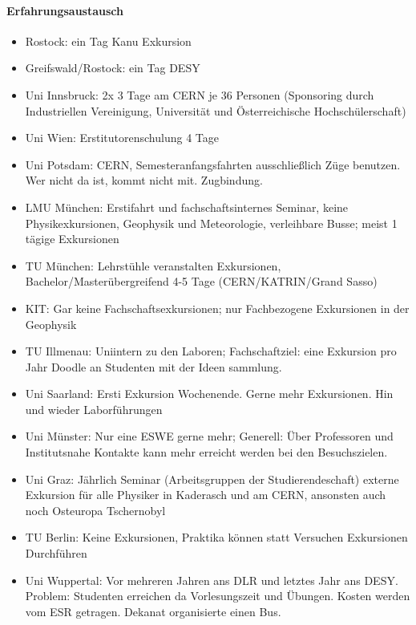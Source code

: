     \paragraph{Erfahrungsaustausch}
      \begin{itemize}
        \item Rostock: ein Tag Kanu Exkursion
        \item Greifswald/Rostock: ein Tag DESY
        \item Uni Innsbruck:
        2x 3 Tage am CERN je 36 Personen (Sponsoring durch Industriellen Vereinigung, Universität und Österreichische Hochschülerschaft)
        \item Uni Wien:
        Erstitutorenschulung 4 Tage
        \item Uni Potsdam: CERN, Semesteranfangsfahrten ausschließlich Züge benutzen. Wer nicht da ist, kommt nicht mit. Zugbindung.
        \item LMU München:
        Erstifahrt und fachschaftsinternes Seminar, keine Physikexkursionen, Geophysik und Meteorologie, verleihbare Busse; meist 1 tägige Exkursionen
        \item TU München:
        Lehrstühle veranstalten Exkursionen, Bachelor/Masterübergreifend 4-5 Tage (CERN/KATRIN/Grand Sasso)
        \item KIT:
        Gar keine Fachschaftsexkursionen; nur Fachbezogene Exkursionen in der Geophysik
        \item TU Illmenau:
        Uniintern zu den Laboren; Fachschaftziel: eine Exkursion pro Jahr Doodle an Studenten mit der Ideen sammlung.
        \item Uni Saarland:
        Ersti Exkursion Wochenende. Gerne mehr Exkursionen. Hin und wieder Laborführungen
        \item Uni Münster:
        Nur eine ESWE gerne mehr; Generell: Über Professoren und Institutsnahe Kontakte kann mehr erreicht werden bei den Besuchszielen.
        \item Uni Graz:
        Jährlich Seminar (Arbeitsgruppen der Studierendeschaft) externe Exkursion für alle Physiker in Kaderasch und am CERN, ansonsten auch noch Osteuropa Tschernobyl
        \item TU Berlin:
        Keine Exkursionen, Praktika können statt Versuchen Exkursionen Durchführen
        \item Uni Wuppertal:
        Vor mehreren Jahren ans DLR und letztes Jahr ans DESY. Problem: Studenten erreichen da Vorlesungszeit und Übungen. Kosten werden vom ESR getragen. Dekanat organisierte einen Bus.

\end{itemize}
